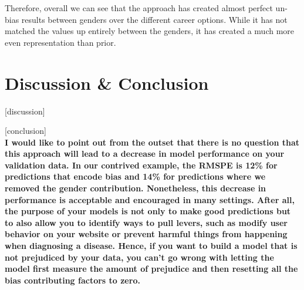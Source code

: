 \documentclass{sigchi}
\begin{document}
	Therefore, overall we can see that the approach has created almost perfect un-bias results between genders over the different career options. While it has not matched the values up entirely between the genders, it has created a much more even representation than prior. 


\section{Discussion \& Conclusion}
	[discussion]
	
	[conclusion] \\
	\textbf{I would like to point out from the outset that there is no question that this approach will lead to a decrease in model performance on your validation data. In our contrived example, the RMSPE is 12\% for predictions that encode bias and 14\% for predictions where we removed the gender contribution. Nonetheless, this decrease in performance is acceptable and encouraged in many settings. After all, the purpose of your models is not only to make good predictions but to also allow you to identify ways to pull levers, such as modify user behavior on your website or prevent harmful things from happening when diagnosing a disease. Hence, if you want to build a model that is not prejudiced by your data, you can’t go wrong with letting the model first measure the amount of prejudice and then resetting all the bias contributing factors to zero.}


\newpage
\balance{}


\end{document}
